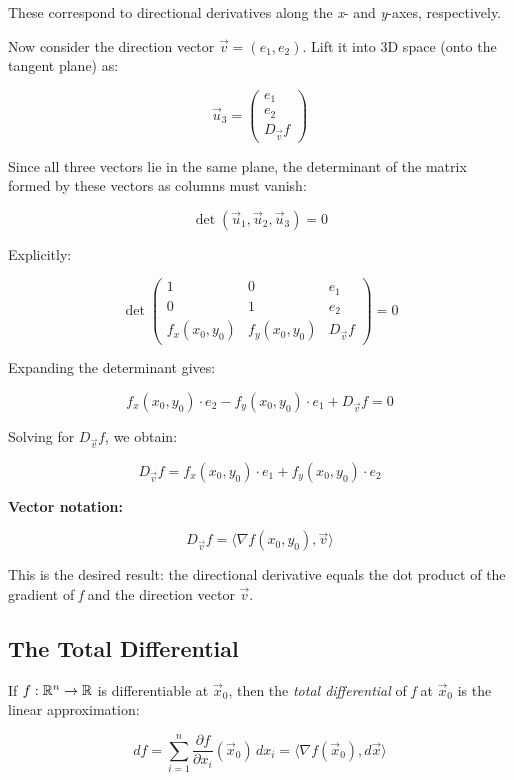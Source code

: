 These correspond to directional derivatives along the \emph{x}- and \emph{y}-axes, respectively.

Now consider the direction vector \( \vec{v} = (e_1, e_2) \). Lift it into 3D space (onto the tangent 
plane) as:

\[
    \vec{u}_3 =
    \begin{pmatrix}
    e_1 \\
    e_2 \\
    D_{\vec{v}}f
    \end{pmatrix}
\]

Since all three vectors lie in the same plane, the determinant of the matrix formed by these vectors as 
columns must vanish:

\[
    \det(\vec{u}_1, \vec{u}_2, \vec{u}_3) = 0
\]

Explicitly:

\[
    \det
    \begin{pmatrix}
    1 & 0 & e_1 \\
    0 & 1 & e_2 \\
    f_x(x_0, y_0) & f_y(x_0, y_0) & D_{\vec{v}}f
    \end{pmatrix} = 0
\]

Expanding the determinant gives:

\[
    f_x(x_0, y_0) \cdot e_2 - f_y(x_0, y_0) \cdot e_1 + D_{\vec{v}}f = 0
\]

Solving for \( D_{\vec{v}}f \), we obtain:

\[
    D_{\vec{v}}f = f_x(x_0, y_0) \cdot e_1 + f_y(x_0, y_0) \cdot e_2
\]

\textbf{Vector notation:}

\[
    D_{\vec{v}}f = \langle \nabla f(x_0, y_0), \vec{v} \rangle
\]

This is the desired result: the directional derivative equals the dot product of the gradient of \emph{f} 
and the direction vector \( \vec{v} \).

\subsection{The Total Differential}

If \( f : \mathbb{R}^n \to \mathbb{R} \) is differentiable at \( \vec{x}_0 \), then the 
\emph{total differential} of \emph{f} at \( \vec{x}_0 \) is the linear approximation:

\[
    df = \sum_{i=1}^n \frac{\partial f}{\partial x_i}(\vec{x}_0) \, dx_i = \langle \nabla f(\vec{x}_0), 
    d\vec{x} \rangle
\]

